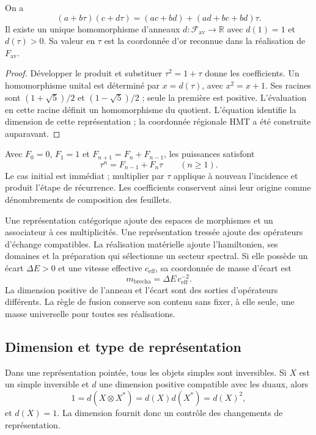 \begin{proposition}
\label{vi:vi:prop:fusion-av}
On a
\[
 (a+b\tau)(c+d\tau)
 =(ac+bd)+(ad+bc+bd)\tau.
\]
Il existe un unique homomorphisme d’anneaux $d:\mathcal F_{\mathrm{av}}
\to\mathbb R$ avec $d(1)=1$ et $d(\tau)>0$. Sa valeur en $\tau$
est la coordonnée d’or reconnue dans la réalisation de $F_{\mathrm{av}}$.
\end{proposition}
\begin{proof}
Développer le produit et substituer $\tau^2=1+\tau$ donne les coefficients.
Un homomorphisme unital est déterminé par $x=d(\tau)$, avec
$x^2=x+1$. Ses racines sont $(1+\sqrt5)/2$ et $(1-\sqrt5)/2$ ;
seule la première est positive. L’évaluation en cette racine définit un
homomorphisme du quotient. L’équation identifie la dimension de cette
représentation ; la coordonnée régionale HMT a été construite auparavant.
\end{proof}

Avec $F_0=0$, $F_1=1$ et $F_{n+1}=F_n+F_{n-1}$, les puissances satisfont
\[
 \tau^n=F_{n-1}+F_n\tau\qquad(n\geq1).
\]
Le cas initial est immédiat ; multiplier par $\tau$ applique à nouveau
l’incidence et produit l’étape de récurrence. Les coefficients conservent
ainsi leur origine comme dénombrements de composition des feuillets.

Une représentation catégorique ajoute des espaces de morphismes et un
associateur à ces multiplicités. Une représentation tressée ajoute
des opérateurs d’échange compatibles. La réalisation matérielle ajoute
l’hamiltonien, ses domaines et la préparation qui sélectionne un
secteur spectral. Si elle possède un écart $\Delta E>0$ et une vitesse effective
$c_{\mathrm{eff}}$, sa coordonnée de masse d’écart est
\[
 m_{\mathrm{brecha}}=\Delta E\,c_{\mathrm{eff}}^{-2}.
\]
La dimension positive de l’anneau et l’écart sont des sorties d’opérateurs
différents. La règle de fusion conserve son contenu sans fixer, à
elle seule, une masse universelle pour toutes ses réalisations.

\subsection{Dimension et type de représentation}

Dans une représentation pointée, tous les objets simples sont
inversibles. Si $X$ est un simple inversible et $d$ une dimension
positive compatible avec les duaux, alors
\[
 1=d(X\otimes X^*)=d(X)d(X^*)=d(X)^2,
\]
et $d(X)=1$. La dimension fournit donc un contrôle des
changements de représentation.


